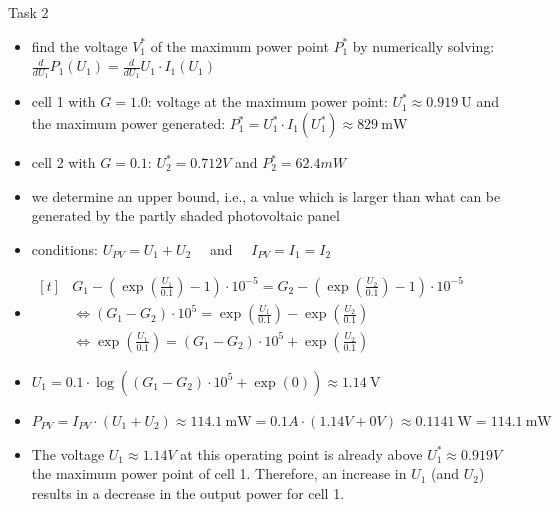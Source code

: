 \begin{frame}[allowframebreaks]{Task 2}{}
\begin{requirementsnoinc}
  \end{requirementsnoinc}
  \begin{solutionnoinc}
    \begin{itemize}
      \item find the \alert{voltage} $V_1^*$ of the \alert{maximum power point} $P_1^*$ by numerically solving: $\displaystyle\frac{d}{d U_1} P_1\left(U_1\right)=\frac{d}{d U_1} U_1 \cdot I_1\left(U_1\right)$
      \item cell 1 with $G=1.0$: voltage at the maximum power point: $U_1^* \approx 0.919 \mathrm{~U}$ and the maximum power generated: $P_1^*=U_1^* \cdot I_1\left(U_1^*\right) \approx 829 \mathrm{~mW}$
      \item cell 2 with $G=0.1$: $U_2^*=0.712V$ and $P_2^*=62.4mW$
      \item  we determine an upper bound, i.e., a value which is larger than what can be generated by the partly shaded photovoltaic panel
      \item conditions: $U_{P V}=U_1+U_2 \quad$ and $\quad I_{P V}=I_1=I_2$
    \end{itemize}
  \end{solutionnoinc}
  \begin{solutionnoinc}
    \begin{itemize}
      \item $\begin{aligned}[t]
            & G_1-\left(\exp \left(\frac{U_1}{0.1}\right)-1\right) \cdot 10^{-5}=G_2-\left(\exp \left(\frac{U_2}{0.1}\right)-1\right) \cdot 10^{-5} \\
            & \Leftrightarrow\left(G_1-G_2\right) \cdot 10^5=\exp \left(\frac{U_1}{0.1}\right)-\exp \left(\frac{U_2}{0.1}\right) \\
            & \Leftrightarrow \exp \left(\frac{U_1}{0.1}\right)=\left(G_1-G_2\right) \cdot 10^5+\exp \left(\frac{U_2}{0.1}\right)
      \end{aligned}$
      \item $U_1=0.1 \cdot \log \left(\left(G_1-G_2\right) \cdot 10^5+\exp (0)\right) \approx 1.14 \mathrm{~V}$
      \item $P_{P V}=I_{P V} \cdot\left(U_1+U_2\right) \approx 114.1 \mathrm{~mW} = 0.1A \cdot\left(1.14V+0V\right) \approx 0.1141 \mathrm{~W} = 114.1 \mathrm{~mW}$
    \end{itemize}
  \end{solutionnoinc}
  \begin{solutionnoinc}
    \begin{itemize}
      \item The voltage $U_1 \approx 1.14 V$ at this operating point is already above $U_1^* \approx 0.919 V$ the maximum power point of cell 1. Therefore, an increase in $U_1$ (and $U_2$) results in a decrease in the output power for cell 1.

\end{itemize}
\end{solutionnoinc}
\end{frame}
